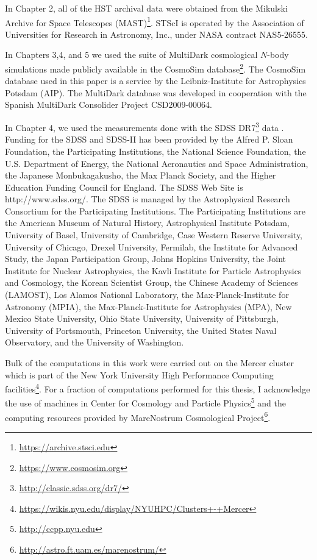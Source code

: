 In Chapter 2, all of the HST archival data were obtained from the Mikulski Archive for Space Telescopes (MAST)\footnote{\url{https://archive.stsci.edu}}. STScI is operated by the Association of Universities for Research in Astronomy, Inc., under NASA contract NAS5-26555.
 
In Chapters 3,4, and 5 we used the suite of MultiDark cosmological $N$-body simulations made publicly available in the CosmoSim database\footnote{\url{https://www.cosmosim.org}}. The CosmoSim database used in this paper is a service by the Leibniz-Institute for Astrophysics Potsdam (AIP). The MultiDark database was developed in cooperation with the Spanish MultiDark Consolider Project CSD2009-00064.

In Chapter 4, we used the measurements done with the SDSS DR7\footnote{\url{http://classic.sdss.org/dr7/}} data \citep{abazajian2009}. 
Funding for the SDSS and SDSS-II has been provided by the Alfred P. Sloan Foundation, the Participating Institutions, the National Science Foundation, the U.S. Department of Energy, the National Aeronautics and Space Administration, the Japanese Monbukagakusho, the Max Planck Society, and the Higher Education Funding Council for England. The SDSS Web Site is http://www.sdss.org/. The SDSS is managed by the Astrophysical Research Consortium for the Participating Institutions. The Participating Institutions are the American Museum of Natural History, Astrophysical Institute Potsdam, University of Basel, University of Cambridge, Case Western Reserve University, University of Chicago, Drexel University, Fermilab, the Institute for Advanced Study, the Japan Participation Group, Johns Hopkins University, the Joint Institute for Nuclear Astrophysics, the Kavli Institute for Particle Astrophysics and Cosmology, the Korean Scientist Group, the Chinese Academy of Sciences (LAMOST), Los Alamos National Laboratory, the Max-Planck-Institute for Astronomy (MPIA), the Max-Planck-Institute for Astrophysics (MPA), New Mexico State University, Ohio State University, University of Pittsburgh, University of Portsmouth, Princeton University, the United States Naval Observatory, and the University of Washington.

Bulk of the computations in this work were carried out on the Mercer cluster which is part of the New York University High Performance Computing facilities\footnote{\url{https://wikis.nyu.edu/display/NYUHPC/Clusters+-+Mercer}}. For a fraction of computations performed for this thesis, I acknowledge the use of machines in Center for Cosmology and Particle Physics\footnote{\url{http://ccpp.nyu.edu}} and the computing resources provided by MareNostrum Cosmological Project\footnote{\url{http://astro.ft.uam.es/marenostrum/}}. 

